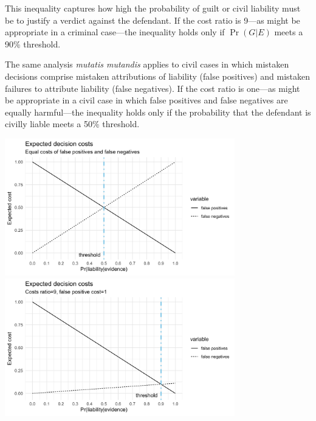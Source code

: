 \documentclass[10pt,dvipsnames]{scrartcl}
\begin{document}
This inequality captures how high the probability of guilt or civil
liability must be to justify a verdict against the defendant. If the
cost ratio is 9---as might be appropriate in a criminal case---the
inequality holds only if \(\Pr(G | E)\) meets a 90\% threshold.

The same analysis \textit{mutatis mutandis} applies to civil cases in
which mistaken decisions comprise mistaken attributions of liability
(false positives) and mistaken failures to attribute liability (false
negatives). If the cost ratio is one---as might be appropriate in a
civil case in which false positives and false negatives are equally
harmful---the inequality holds only if the probability that the
defendant is civilly liable meets a 50\% threshold.

\begin{center}
\includegraphics[width=10cm]{civil2.png}
\includegraphics[width=10cm]{criminal4.png}   
\end{center}
\end{document}
